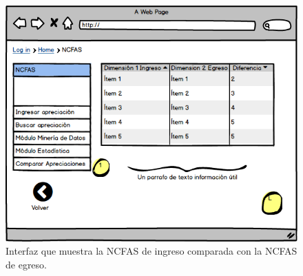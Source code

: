 \begin{figure}[h!]
	\label{compara}
	\begin{center}
		\includegraphics[scale=0.3]{imagenes/compara.png}
	\end{center}
	\caption{Interfaz que muestra la NCFAS de ingreso comparada con la NCFAS de egreso.}
\end{figure}

